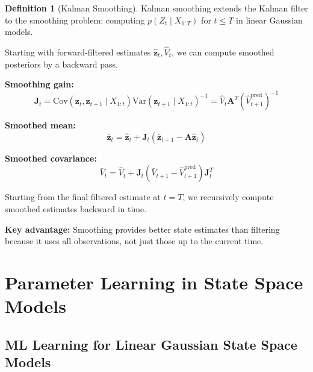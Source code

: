 \documentclass[12pt,a4paper]{article}
\theoremstyle{definition}
\newtheorem{definition}{Definition}[section]
\begin{document}
\begin{definition}[Kalman Smoothing]
Kalman smoothing extends the Kalman filter to the smoothing problem: computing $p(Z_t \mid X_{1:T})$ for $t \leq T$ in linear Gaussian models.

Starting with forward-filtered estimates $\hat{\mathbf{z}}_t, \hat{V}_t$, we can compute smoothed posteriors by a backward pass.

\textbf{Smoothing gain:}
\[
\mathbf{J}_t = \text{Cov}(\mathbf{z}_t, \mathbf{z}_{t+1} \mid X_{1:t}) \text{Var}(\mathbf{z}_{t+1} \mid X_{1:t})^{-1} = \hat{V}_t \mathbf{A}^T (\hat{V}_{t+1}^{\text{pred}})^{-1}
\]

\textbf{Smoothed mean:}
\[
\bar{\mathbf{z}}_t = \hat{\mathbf{z}}_t + \mathbf{J}_t (\bar{\mathbf{z}}_{t+1} - \mathbf{A} \hat{\mathbf{z}}_t)
\]

\textbf{Smoothed covariance:}
\[
\bar{V}_t = \hat{V}_t + \mathbf{J}_t (\bar{V}_{t+1} - \hat{V}_{t+1}^{\text{pred}}) \mathbf{J}_t^T
\]

Starting from the final filtered estimate at $t=T$, we recursively compute smoothed estimates backward in time.

\textbf{Key advantage:} Smoothing provides better state estimates than filtering because it uses all observations, not just those up to the current time.
\end{definition}

\newpage


\section{Parameter Learning in State Space Models}

\subsection{ML Learning for Linear Gaussian State Space Models}
\end{document}
